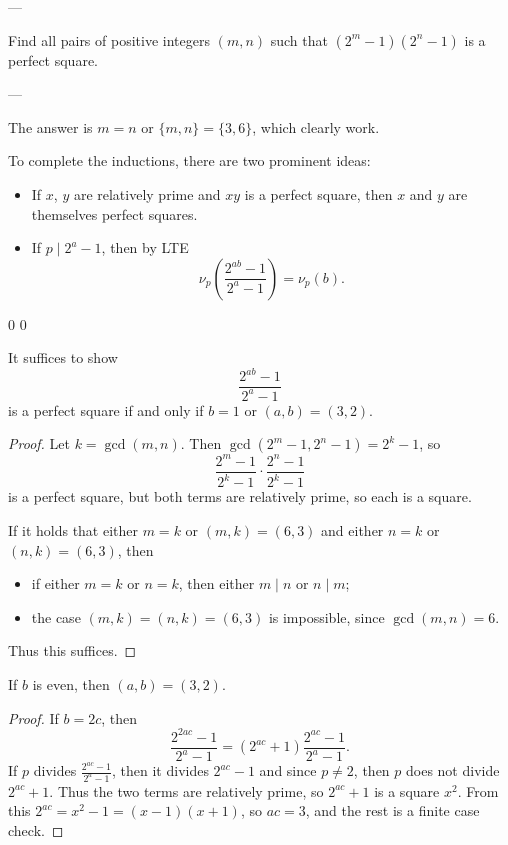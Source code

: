 
---

Find all pairs of positive integers $(m,n)$ such that $(2^m-1)(2^n-1)$ is a perfect square.

---

The answer is $m=n$ or $\{m,n\}=\{3,6\}$, which clearly work.
\begin{boxremark}
    To complete the inductions, there are two prominent ideas:
    \begin{itemize}
        \item If $x$, $y$ are relatively prime and $xy$ is a perfect square, then $x$ and $y$ are themselves perfect squares.
        \item If $p\mid2^a-1$, then by LTE \[\nu_p\left(\frac{2^{ab}-1}{2^a-1}\right)=\nu_p(b).\]
    \end{itemize}
\end{boxremark}
\setcounter{iclaim}0
\setcounter{boxlemma}0
\begin{boxlemma}
    It suffices to show \[\dfrac{2^{ab}-1}{2^a-1}\]
    is a perfect square if and only if $b=1$ or $(a,b)=(3,2)$.
\end{boxlemma}
\begin{proof}
    Let $k=\gcd(m,n)$. Then $\gcd(2^m-1,2^n-1)=2^k-1$, so \[\frac{2^m-1}{2^k-1}\cdot\frac{2^n-1}{2^k-1}\]
    is a perfect square, but both terms are relatively prime, so each is a square.

    If it holds that either $m=k$ or $(m,k)=(6,3)$ and either $n=k$ or $(n,k)=(6,3)$, then
    \begin{itemize}[itemsep=0em]
        \item if either $m=k$ or $n=k$, then either $m\mid n$ or $n\mid m$;
        \item the case $(m,k)=(n,k)=(6,3)$ is impossible, since $\gcd(m,n)=6$.
    \end{itemize}
    Thus this suffices.
\end{proof}
\begin{boxlemma}
    If $b$ is even, then $(a,b)=(3,2)$.
\end{boxlemma}
\begin{proof}
    If $b=2c$, then \[\frac{2^{2ac}-1}{2^a-1}=\left(2^{ac}+1\right)\frac{2^{ac}-1}{2^a-1}.\]
    If $p$ divides $\tfrac{2^{ac}-1}{2^a-1}$, then it divides $2^{ac}-1$ and since $p\ne2$, then $p$ does not divide $2^{ac}+1$. Thus the two terms are relatively prime, so $2^{ac}+1$ is a square $x^2$. From this $2^{ac}=x^2-1=(x-1)(x+1)$, so $ac=3$, and the rest is a finite case check.
\end{proof}

